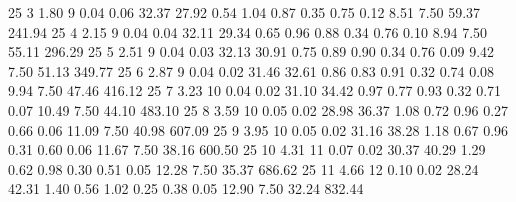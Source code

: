 \begin{pythoncode}
25  3  1.80  9  0.04  0.06  32.37  27.92  0.54  1.04  0.87  0.35  0.75  0.12  8.51  7.50  59.37  241.94
25  4  2.15  9  0.04  0.04  32.11  29.34  0.65  0.96  0.88  0.34  0.76  0.10  8.94  7.50  55.11  296.29
25  5  2.51  9  0.04  0.03  32.13  30.91  0.75  0.89  0.90  0.34  0.76  0.09  9.42  7.50  51.13  349.77
25  6  2.87  9  0.04  0.02  31.46  32.61  0.86  0.83  0.91  0.32  0.74  0.08  9.94  7.50  47.46  416.12
25  7  3.23  10  0.04  0.02  31.10  34.42  0.97  0.77  0.93  0.32  0.71  0.07  10.49  7.50  44.10  483.10
25  8  3.59  10  0.05  0.02  28.98  36.37  1.08  0.72  0.96  0.27  0.66  0.06  11.09  7.50  40.98  607.09
25  9  3.95  10  0.05  0.02  31.16  38.28  1.18  0.67  0.96  0.31  0.60  0.06  11.67  7.50  38.16  600.50
25  10  4.31  11  0.07  0.02  30.37  40.29  1.29  0.62  0.98  0.30  0.51  0.05  12.28  7.50  35.37  686.62
25  11  4.66  12  0.10  0.02  28.24  42.31  1.40  0.56  1.02  0.25  0.38  0.05  12.90  7.50  32.24  832.44


\end{pythoncode}